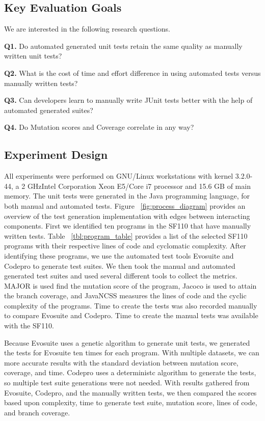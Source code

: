 \documentclass[conference]{IEEEtran}
\begin{document}
\subsection{Key Evaluation Goals}

We are interested in the following research questions.

\textbf{Q1.} Do automated generated unit tests retain the same quality as manually written unit tests?

\textbf{Q2.} What is the cost of time and effort difference in using automated tests versus manually written tests?

\textbf{Q3.} Can developers learn to manually write JUnit tests better with the help of automated generated suites?

\textbf{Q4.} Do Mutation scores and Coverage correlate in any way?

\subsection{Experiment Design}

All experiments were performed on GNU/Linux workstations with kernel 3.2.0-44, a 2 GHzIntel Corporation Xeon E5/Core i7 processor and  15.6 GB of main memory. The unit tests were generated in the Java programming language, for both manual and automated tests. Figure ~\ref{fig:process_diagram}  provides an overview of the test generation implementation with edges between interacting components. First we identified ten programs in the SF110 that have manually written tests. Table ~\ref{tbl:program_table} provides a list of the selected SF110 programs with their respective lines of code and cyclomatic complexity.  After identifying these programs, we use the automated test tools Evosuite and Codepro to generate test suites. We then took the manual and automated generated test suites and used several different tools to collect the metrics. MAJOR is used find the mutation score of the program, Jacoco is used to attain the branch coverage, and JavaNCSS measures the lines of code and the cyclic complexity of the programs. Time to create the tests was also recorded manually to compare Evosuite and Codepro. Time to create the manual tests was available with the SF110.

Because Evosuite uses a genetic algorithm to generate unit tests, we generated the tests for Evosuite ten times for each program. With multiple datasets, we can more accurate results with the standard deviation between mutation score, coverage, and time. Codepro uses a deterministc algorithm to generate the tests, so multiple test suite generations were not needed. With results gathered from Evosuite, Codepro, and the manually written tests, we then compared the scores based upon complexity, time to generate test suite, mutation score, lines of code, and branch coverage.
\end{document}
